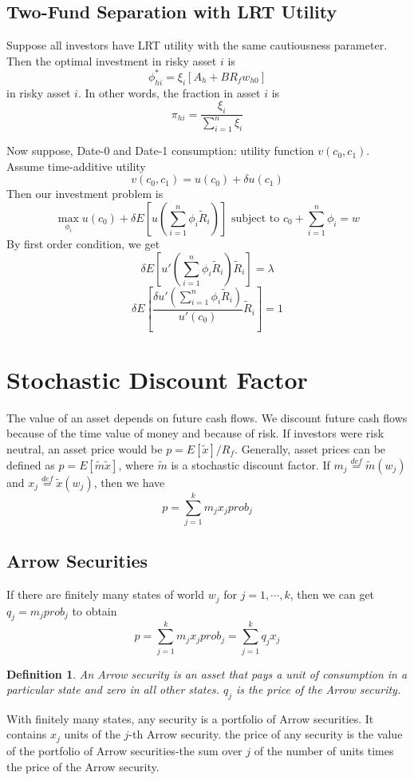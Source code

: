 \documentclass[11pt, a4paper, oneside]{article}
\newtheorem{mydef}{Definition}
\theoremstyle{definition}
\theoremstyle{proposition}
\theoremstyle{corollary}
\theoremstyle{lemma}
\theoremstyle{theorem}
\begin{document}
\subsection{Two-Fund Separation with LRT Utility}
Suppose all investors have LRT utility with the same cautiousness parameter. Then the optimal investment in risky asset $i$ is
$$\phi_{hi}^* = \xi_i[A_h+BR_fw_{h0}]$$ in risky asset $i$. In other words, the fraction in asset $i$ is
$$\pi_{hi} = \frac{\xi_i}{\sum_{i=1}^n \xi_i}$$

Now suppose, Date-0 and Date-1 consumption: utility function $v(c_0, c_1)$. Assume time-additive utility 
$$v(c_0,c_1) = u(c_0) +\delta u(c_1)$$
Then our investment problem is 
$$\max_{\phi_i} u(c_0)+\delta E\left[u\left(\sum_{i=1}^n \phi_i \tilde{R}_i\right)\right] \text{ subject to } c_0 +\sum_{i=1}^n \phi_i = w$$
By first order condition, we get
$$\delta E\left[u'\left(\sum_{i=1}^n \phi_i\tilde{R}_i\right)\tilde{R}_i\right] = \lambda$$
$$\delta E\left[\frac{\delta u'\left(\sum_{i=1}^n \phi_i\tilde{R}_i\right)}{u'(c_0)}\tilde{R}_i\right] = 1$$ 

\section{Stochastic Discount Factor}
The value of an asset depends on future cash flows. We discount future cash flows because of the time value of money and because of risk. If investors were risk neutral, an asset price would be $p= E[\tilde{x}]/R_f$. Generally, asset prices can be defined as $p = E[\tilde{m}\tilde{x}]$, where $\tilde{m}$ is a stochastic discount factor. If $m_j \overset{def}{=} \tilde{m}(w_j)$ and $x_j \overset{def}{=}\tilde{x}(w_j)$, then we have
$$p = \sum_{j=1}^k m_jx_jprob_j$$ 

\subsection{Arrow Securities}
If there are finitely many states of world $w_j$ for $j = 1, \cdots, k$, then we can get $q_j = m_jprob_j$ to obtain
$$p = \sum_{j=1}^k m_j x_j prob_j = \sum_{j=1}^k q_j x_j$$

\begin{mydef}
An Arrow security is an asset that pays a unit of consumption in a particular state and zero in all other states. $q_j$ is the price of the Arrow security. 
\end{mydef}

With finitely many states, any security is a portfolio of Arrow securities. It contains $x_j$ units of the $j$-th Arrow security. the price of any security is the value of the portfolio of Arrow securities-the sum over $j$ of the number of units times the price of the Arrow security. 
\end{document}
